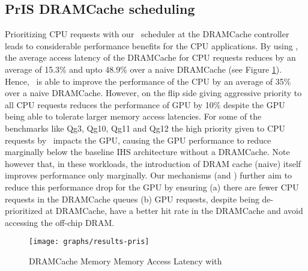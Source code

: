 \subsection{PrIS DRAMCache scheduling}
Prioritizing CPU requests with our \prioname\ scheduler at the DRAMCache controller leads to considerable performance benefits for the CPU applications. By using \prioname, the average access latency of the DRAMCache for CPU requests reduces by an average of 15.3\% and upto 48.9\% over a naive DRAMCache (see Figure \ref{results-pris}). Hence, \prioname\ is able to improve the performance of the CPU by an average of 35\% over a naive DRAMCache. However, on the flip side giving aggressive priority to all CPU requests reduces the performance of GPU by 10\% despite the GPU being able to tolerate larger memory access latencies. For some of the benchmarks like Qg3, Qg10, Qg11 and Qg12 the high priority given to CPU requests by \prioname\ impacts the GPU, causing the GPU performance to reduce marginally below the baseline IHS architecture without a DRAMCache. Note however that, in these workloads, the introduction of DRAM cache (naive) itself improves performance only marginally. Our mechanisms (\bypassname and \chaining) further aim to reduce this performance drop for the GPU by ensuring (a) there are fewer CPU requests in the DRAMCache queues (b) GPU requests, despite being de-prioritized at DRAMCache, have a better hit rate in the DRAMCache and avoid accessing the off-chip DRAM.

\begin{figure}[htb]
	\centering
	\texttt{[image: graphs/results-pris]}
	\caption{DRAMCache Memory Memory Access Latency with }
	\label{results-pris}
\end{figure}


